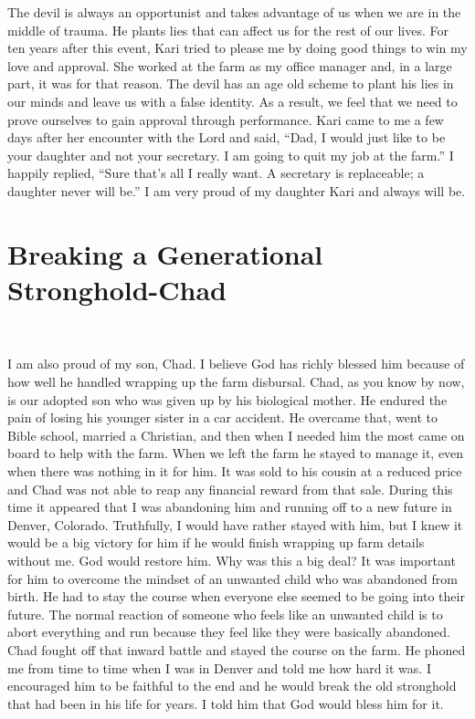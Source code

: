 \documentclass[oneside]{book}
\begin{document}
The devil is always an opportunist and takes advantage of us when we are in the middle of trauma. He plants lies that can affect us for the rest of our lives. For ten years after this event,  Kari tried to please me by doing good things to win my love and approval. She worked at the farm as my office manager and, in a large part, it was for that reason. The devil has an age old scheme to plant his lies in our minds and leave us with a false identity. As a result, we feel that we need to prove ourselves to gain approval through performance. Kari came to me a few days after her encounter with the Lord and said, “Dad, I would just like to be your daughter and not your secretary. I am going to quit my job at the farm.” I happily replied, “Sure that’s all I really want. A secretary is replaceable; a daughter never will be.” I am  very proud of my daughter Kari and always will be. 


\section{Breaking a Generational Stronghold-Chad}
\

I am also proud of my son, Chad. I believe God has richly blessed him because of how well he handled wrapping up the farm disbursal. Chad, as you know by now, is our adopted son who was given up by his biological mother. He endured the pain of losing his younger sister in a car accident. He overcame that, went to Bible school, married a Christian, and then when I needed him the most came on board to help with the farm. When we left the farm he stayed to manage it, even when there was nothing in it for him. It was sold to his cousin at a reduced price and Chad was not able to reap any financial reward from that sale. During this time it appeared that I was abandoning him and running off to a new future in Denver, Colorado. Truthfully, I would have rather stayed with him, but I knew it would be a big victory for him if he would finish wrapping up farm details without me. God would restore him. Why was this a big deal? It was important for him to overcome the mindset of an unwanted child who was abandoned from birth. He had to stay the course when everyone else seemed to be going into their future. The normal reaction of someone who feels like an unwanted child is to abort everything and run because they feel like they were basically abandoned. Chad fought off that inward battle and stayed the course on the farm. He phoned me from time to time when I was in Denver and told me how hard it was. I encouraged him to be faithful to the end and he would break the old stronghold that had been in his life for years. I told him that God would bless him for it. 
\end{document}
